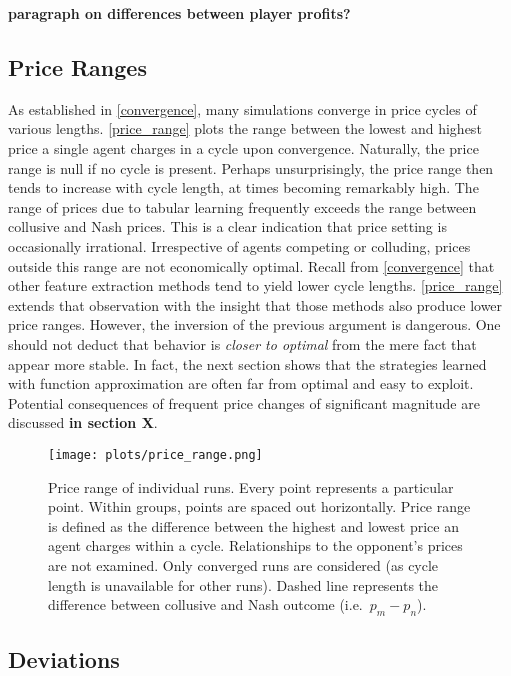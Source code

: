 \textbf{paragraph on differences between player profits?}

\subsection{Price Ranges}\label{prices}

As established in \autoref{convergence}, many simulations converge in price cycles of various lengths. \autoref{price_range} plots the range between the lowest and highest price a single agent charges in a cycle upon convergence. Naturally, the price range is null if no cycle is present. Perhaps unsurprisingly, the price range then tends to increase with cycle length, at times becoming remarkably high. The range of prices due to tabular learning frequently exceeds the range between collusive and Nash prices. This is a clear indication that price setting is occasionally irrational. Irrespective of agents competing or colluding, prices outside this range are not economically optimal. Recall from \autoref{convergence} that other feature extraction methods tend to yield lower cycle lengths. \autoref{price_range} extends that observation with the insight that those methods also produce lower price ranges. However, the inversion of the previous argument is dangerous. One should not deduct that behavior is \emph{closer to optimal} from the mere fact that appear more stable. In fact, the next section shows that the strategies learned with function approximation are often far from optimal and easy to exploit. Potential consequences of frequent price changes of significant magnitude are discussed \textbf{in section X}.

\begin{figure}
	\texttt{[image: plots/price\_range.png]}
	\caption{Price range of individual runs. Every point represents a particular point. Within groups, points are spaced out horizontally. Price range is defined as the difference between the highest and lowest price an agent charges within a cycle. Relationships to the opponent's prices are not examined. Only converged runs are considered (as cycle length is unavailable for other runs). Dashed line represents the difference between collusive and Nash outcome (i.e.\ $p_m - p_n$).}
	\label{price_range}
\end{figure}


\subsection{Deviations}\label{deviations}

